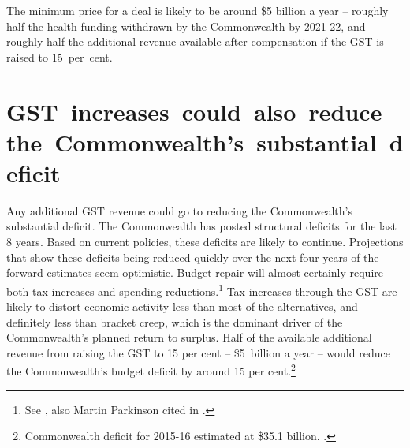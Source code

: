 The minimum price for a deal is likely to be around \$5 billion a year – roughly half the health funding withdrawn by the Commonwealth by 2021-22,  and roughly half the additional revenue available after compensation if the GST is raised to 15~per~cent.

\section{\mbox{GST increases could also reduce the Commonwealth's substantial deficit}}\label{sec:GST-4-2}
Any additional GST revenue could go to reducing the Commonwealth’s substantial deficit. The Commonwealth has posted structural deficits for the last 8 years.  Based on current policies, these deficits are likely to continue. Projections that show these deficits being reduced quickly over the next four years of the forward estimates seem optimistic.  Budget repair will almost certainly require both tax increases and spending reductions.\footnote{See , also Martin Parkinson cited in \textcite{Uren2015-Parkinson-tackle-spending-revenue}.}  Tax increases through the GST are likely to distort economic activity less than most of the alternatives, and definitely less than bracket creep, which is the dominant driver of the Commonwealth’s planned return to surplus.  Half of the available additional revenue from raising the GST to 15 per cent – \$5~billion a year  – would reduce the Commonwealth’s budget deficit by around 15 per cent.\footnote{Commonwealth deficit for 2015-16 estimated at \$35.1 billion. \textcite{Treasury2015FinalBudgetOutcome1415}.} 

